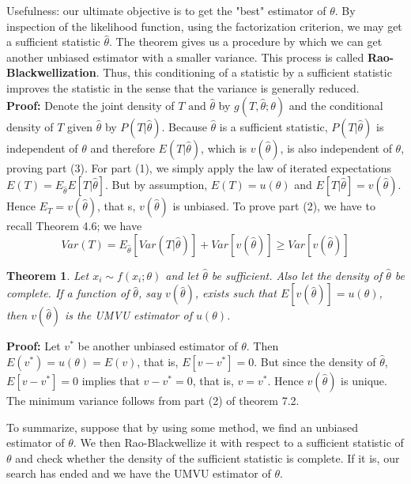 \documentclass{article}
\newtheorem{theorem}{Theorem}[section]
\begin{document}
Usefulness: our ultimate objective is to get the "best" estimator of \(\theta\). By inspection of the likelihood function, using the factorization criterion, we may get a sufficient statistic \(\hat{\theta}\). The theorem gives us a procedure by which we can get another unbiased estimator with a smaller variance. This process is called \textbf{Rao-Blackwellization}. Thus, this conditioning of a statistic by a sufficient statistic improves the statistic in the sense that the variance is generally reduced.\\

\textbf{Proof:} Denote the joint density of \(T \text{ and } \hat{\theta}\) by \(g(T,\hat{\theta};\theta)\) and the conditional density of \(T\) given \(\hat{\theta}\) by \(P(T|\hat{\theta})\). Because \(\hat{\theta}\) is a sufficient statistic, \(P(T|\hat{\theta})\) is independent of \(\theta\) and therefore \(E(T|\hat{\theta})\), which is \(v(\hat{\theta})\), is also independent of \(\theta\), proving part (3). For part (1), we simply apply the law of iterated expectations \(E(T)=E_{\hat{\theta}}E[T|\hat{\theta}]\). But by assumption, \(E(T)=u(\theta)\) and \(E[T|\hat{\theta}]=v(\hat{\theta})\). Hence \(E_T=v(\hat{\theta})\), that s, \(v(\hat{\theta})\) is unbiased. To prove part (2), we have to recall Theorem 4.6; we have
\begin{equation*}
    Var(T)=E_{\hat{\theta}}[Var(T|\hat{\theta})]+Var[v(\hat{\theta})] \geq Var[v(\hat{\theta})]
\end{equation*}

\begin{theorem}
    Let \(x_i \sim f(x_i;\theta)\) and let \(\hat{\theta}\) be sufficient. Also let the density of \(\hat{\theta}\) be complete. If a function of \(\hat{\theta}\), say \(v(\hat{\theta})\), exists such that \(E[v(\hat{\theta})]=u(\theta)\), then \(v(\hat{\theta})\) is the UMVU estimator of \(u(\theta)\).
\end{theorem}

\textbf{Proof:} Let \(v^*\) be another unbiased estimator of \(\theta\). Then \(E(v^*)=u(\theta)=E(v)\), that is, \(E[v-v^*]=0\). But since the density of \(\hat{\theta}\), \(E[v-v^*]=0\) implies that \(v-v^*=0\), that is, \(v=v^*\). Hence \(v(\hat{\theta})\) is unique. The minimum variance follows from part (2) of theorem 7.2.

To summarize, suppose that by using some method, we find an unbiased estimator of $\theta$. We then Rao-Blackwellize it with respect to a sufficient statistic of \(\theta\) and check whether the density of the sufficient statistic is complete. If it is, our search has ended and we have the UMVU estimator of $\theta$.
\end{document}
